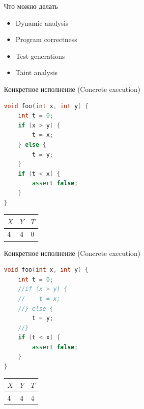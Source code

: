 \documentclass{beamer}
\begin{document}
\begin{frame}{Что можно делать}
\begin{itemize}
\item Dynamic analysis
\item Program correctness
\item Test generations
\item Taint analysis
\end{itemize}
\end{frame}

\begin{frame}[fragile]{Конкретное исполнение (Concrete execution)}
\begin{minipage}{0.49\textwidth}
\begin{lstlisting}[language=C++]
void foo(int x, int y) {
    int t = 0;
    if (x > y) {
        t = x;
    } else {
        t = y;
    }
    if (t < x) {
        assert false;
    }
}
\end{lstlisting}
\end{minipage}
\hfill
\begin{minipage}{0.49\textwidth}
\begin{center}
\begin{tabular}{ | l | l | l | }
\hline
$X$ & $Y$ & $T$ \\
\hline
4 & 4 & 0 \\
\hline
\end{tabular}
\end{center}
\end{minipage}
\end{frame}

\begin{frame}[fragile]{Конкретное исполнение (Concrete execution)}
\begin{minipage}{0.49\textwidth}
\begin{lstlisting}[language=C++]
void foo(int x, int y) {
    int t = 0;
    //if (x > y) {
    //    t = x;
    //} else {
        t = y;
    //}
    if (t < x) {
        assert false;
    }
}
\end{lstlisting}
\end{minipage}
\hfill
\begin{minipage}{0.49\textwidth}
\begin{center}
\begin{tabular}{ | l | l | l | }
\hline
$X$ & $Y$ & $T$ \\
\hline
4 & 4 & 4 \\
\hline
\end{tabular}
\end{center}
\end{minipage}
\end{frame}
\end{document}
